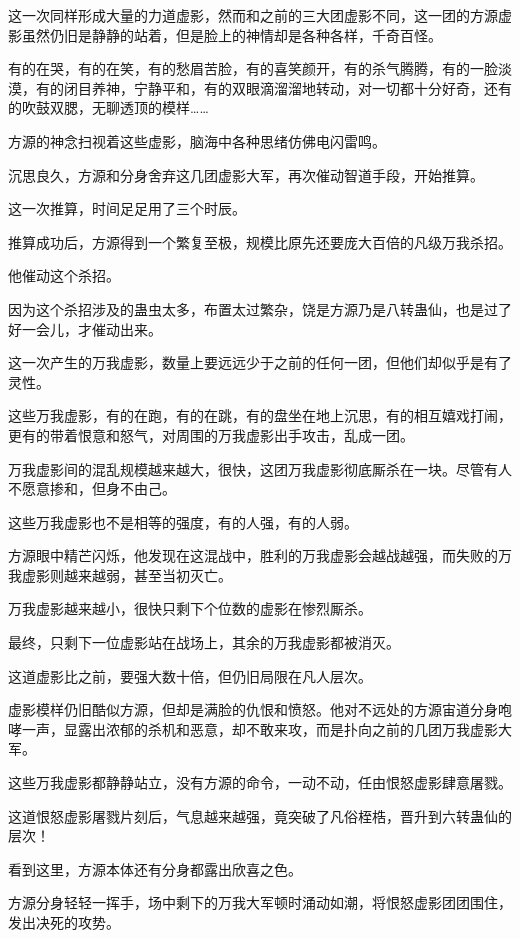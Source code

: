 \begin{this_body}
这一次同样形成大量的力道虚影，然而和之前的三大团虚影不同，这一团的方源虚影虽然仍旧是静静的站着，但是脸上的神情却是各种各样，千奇百怪。

有的在哭，有的在笑，有的愁眉苦脸，有的喜笑颜开，有的杀气腾腾，有的一脸淡漠，有的闭目养神，宁静平和，有的双眼滴溜溜地转动，对一切都十分好奇，还有的吹鼓双腮，无聊透顶的模样……

方源的神念扫视着这些虚影，脑海中各种思绪仿佛电闪雷鸣。

沉思良久，方源和分身舍弃这几团虚影大军，再次催动智道手段，开始推算。

这一次推算，时间足足用了三个时辰。

推算成功后，方源得到一个繁复至极，规模比原先还要庞大百倍的凡级万我杀招。

他催动这个杀招。

因为这个杀招涉及的蛊虫太多，布置太过繁杂，饶是方源乃是八转蛊仙，也是过了好一会儿，才催动出来。

这一次产生的万我虚影，数量上要远远少于之前的任何一团，但他们却似乎是有了灵性。

这些万我虚影，有的在跑，有的在跳，有的盘坐在地上沉思，有的相互嬉戏打闹，更有的带着恨意和怒气，对周围的万我虚影出手攻击，乱成一团。

万我虚影间的混乱规模越来越大，很快，这团万我虚影彻底厮杀在一块。尽管有人不愿意掺和，但身不由己。

这些万我虚影也不是相等的强度，有的人强，有的人弱。

方源眼中精芒闪烁，他发现在这混战中，胜利的万我虚影会越战越强，而失败的万我虚影则越来越弱，甚至当初灭亡。

万我虚影越来越小，很快只剩下个位数的虚影在惨烈厮杀。

最终，只剩下一位虚影站在战场上，其余的万我虚影都被消灭。

这道虚影比之前，要强大数十倍，但仍旧局限在凡人层次。

虚影模样仍旧酷似方源，但却是满脸的仇恨和愤怒。他对不远处的方源宙道分身咆哮一声，显露出浓郁的杀机和恶意，却不敢来攻，而是扑向之前的几团万我虚影大军。

这些万我虚影都静静站立，没有方源的命令，一动不动，任由恨怒虚影肆意屠戮。

这道恨怒虚影屠戮片刻后，气息越来越强，竟突破了凡俗桎梏，晋升到六转蛊仙的层次！

看到这里，方源本体还有分身都露出欣喜之色。

方源分身轻轻一挥手，场中剩下的万我大军顿时涌动如潮，将恨怒虚影团团围住，发出决死的攻势。


\end{this_body}

